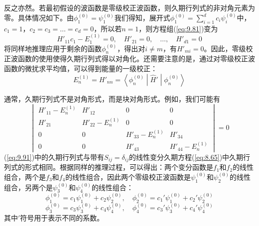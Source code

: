     反之亦然。若最初假设的波函数是零级校正波函数，则久期行列式的非对角元素为零。具体情况如下。由$\phi_1^{\left(0\right)} = \psi_1^{\left(0\right)}$我们得知，展开式$\phi_1^{\left(0\right)} = \sum_{i=1}^{d}c_i\psi_i^{\left(0\right)}$中，$c_1 = 1$，$c_2 = c_3 = \ldots = c_d = 0$，所以若$n=1$，则方程组(\ref{eq:9.81})变为
    \begin{equation*}
        H'_{11}c_1 - E_1^{\left(1\right)} = 0, \quad H'_{21} = 0, \quad \ldots, \quad H'_{d1} = 0
    \end{equation*}
    将同样地推理应用于剩余的函数$\phi_n^{\left(0\right)}$，得出对$i \neq m$，有$H'_{mi} = 0$。因此，零级校正波函数的使用使得久期行列式得以对角化。还需要注意的是，通过对零级校正波函数的微扰求平均值，可以得到能量的一级校正：
    \begin{equation}
        E_n^{\left(1\right)} = H'_{nn} = \left\langle \phi_n^{\left(0\right)} \middle| \hat{H}' \middle| \phi_n^{\left(0\right)} \right\rangle
        \label{eq:9.90}
    \end{equation}

    通常，久期行列式不是对角形式，而是块对角形式。例如，我们可能有
    \begin{equation}
        \begin{vmatrix}
            H'_{11} - E_n^{\left(1\right)} & H'_{12} & 0 & 0 \\
            H'_{21} & H'_{22} - E_n^{\left(1\right)} & 0 & 0 \\
            0 & 0 & H'_{33} - E_n^{\left(1\right)} & H'_{34} \\
            0 & 0 & H'_{43} & H'_{44} - E_n^{\left(1\right)}
        \end{vmatrix} = 0
        \label{eq:9.91}
    \end{equation}
    (\ref{eq:9.91})中的久期行列式与带有$S_{ij} = \delta_{ij}$的线性变分久期方程(\ref{eq:8.65})中久期行列式的形式相同。根据同样的推理过程，可以得出：两个变分函数是$f_1$和$f_2$的线性组合，两个是$f_3$和$f_4$的线性组合，因此两个零级校正波函数是$\psi_1^{\left(0\right)}$和$\psi_2^{\left(0\right)}$的线性组合，另两个是$\psi_3^{\left(0\right)}$和$\psi_4^{\left(0\right)}$的线性组合：
    \begin{equation*}
        \phi_1^{\left(0\right)} = c_1\psi_1^{\left(0\right)} + c_2\psi_2^{\left(0\right)}, \quad \phi_2^{\left(0\right)} = c_1'\psi_1^{\left(0\right)} + c_2'\psi_2^{\left(0\right)}
    \end{equation*}
    \begin{equation*}
        \phi_3^{\left(0\right)} = c_3\psi_3^{\left(0\right)} + c_4\psi_4^{\left(0\right)}, \quad \phi_4^{\left(0\right)} = c_3'\psi_3^{\left(0\right)} + c_4'\psi_4^{\left(0\right)}
    \end{equation*}
    其中$'$符号用于表示不同的系数。

